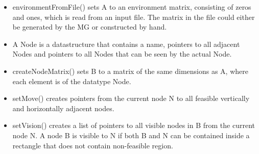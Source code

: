 \begin{itemize}
\item environmentFromFile() sets A to an environment matrix, consisting of zeros and ones, which is read from an input file. The matrix in the file could either be generated by the MG or constructed by hand.
\item A Node is a datastructure that contains a name, pointers to all adjacent Nodes and pointers to all Nodes that can be seen by the actual Node.
\item createNodeMatrix() sets B to a matrix of the same dimensions as A, where each element is of the datatype Node.
\item setMove() creates pointers from the current node N to all feasible vertically and horizontally adjacent nodes.
\item setVision() creates a list of pointers to all visible nodes in B from the current node N. A node B is visible to N if both B and N can be contained inside a rectangle that does not contain non-feasible region.

\end{itemize}